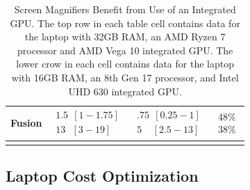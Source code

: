 \begin{longtable}[]{
>{\raggedright\arraybackslash}m{}
>{\raggedright\arraybackslash}m{}
>{\raggedright\arraybackslash}m{}
>{\raggedright\arraybackslash}m{}
}
Fusion & $\begin{array}{l}1.5~~[1-1.75] \\13~~~[3-19]\end{array}$ & $\begin{array}{l}.75~~[0.25-1] \\5~~~~~[2.5-13]\end{array}$ & $\begin{array}{l} 48\% \\ 38\%\end{array}$ \\[1.0em]\hline
\caption[Screen Magnifiers Benefit from Integrated GPU]{Screen Magnifiers Benefit from Use of an Integrated GPU. The top row in each table cell contains data for the laptop with 32GB RAM, an AMD Ryzen 7 processor and AMD Vega 10 integrated GPU. The lower crow in each cell contains data for the laptop with 16GB RAM, an 8th Gen 17 processor, and Intel UHD 630 integrated GPU.} \label{tab:table51}
\end{longtable}

\pagebreak	\hypertarget{optimizing-cost-with-performance}{}\subsection{Laptop Cost Optimization}\label{optimizing-cost-with-performance}

